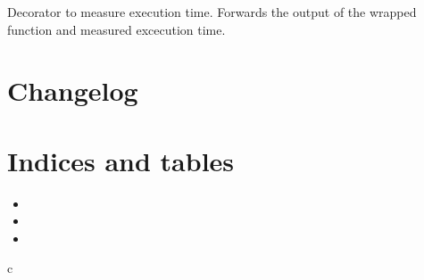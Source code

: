 \documentclass[letterpaper,10pt,english]{sphinxmanual}
\begin{document}

\begin{fulllineitems}
\label{\detokenize{documentation:cnn.timed}}
Decorator to measure execution time.  Forwards the output of the
wrapped function and measured excecution time.

\end{fulllineitems}



\chapter{Changelog}
\label{\detokenize{changelog:changelog}}\label{\detokenize{changelog::doc}}

\chapter{Indices and tables}
\label{\detokenize{index:indices-and-tables}}\begin{itemize}
\item {} 

\item {} 

\item {} 

\end{itemize}


\renewcommand{\indexname}{Python Module Index}
\begin{sphinxtheindex}
\def\bigletter#1{{\Large\sffamily#1}\nopagebreak\vspace{1mm}}
\bigletter{c}
\item {}
\end{sphinxtheindex}

\renewcommand{\indexname}{Index}
\printindex
\end{document}
